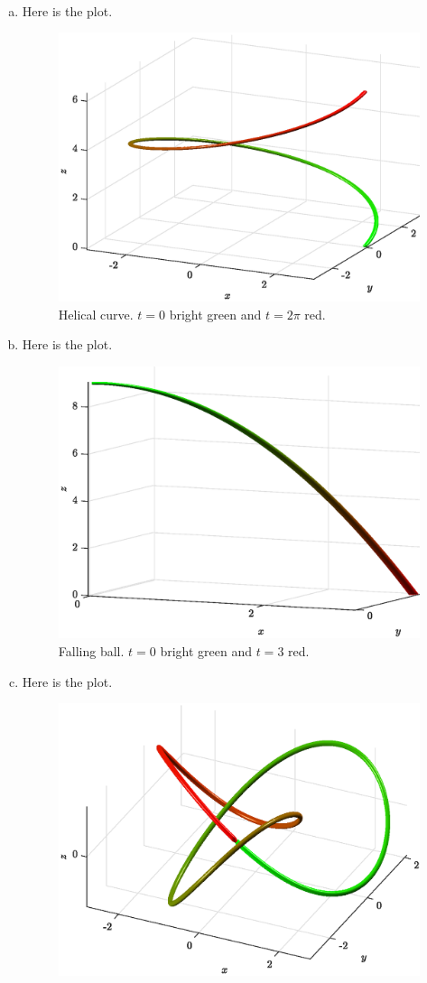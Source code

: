 \documentclass[12pt]{article} %
\begin{document}
\begin{solution}~
\begin{enumerate}[(a)]
    \item Here is the plot.
    \begin{figure}[H]
        \centering
        \includegraphics[width=.65\textwidth]{figures/helix}
        \caption{Helical curve. $t=0$ bright green and $t=2\pi$ red.}
    \end{figure}
    \item Here is the plot.
    \begin{figure}[H]
        \centering
        \includegraphics[width=.65\textwidth]{figures/falling_ball}
        \caption{Falling ball. $t=0$ bright green and $t=3$ red.}
    \end{figure}
    \item Here is the plot.
    \begin{figure}[H]
        \centering
        \includegraphics[width=.65\textwidth]{figures/trefoil_knot}

\end{figure}
\end{enumerate}
\end{solution}
\end{document}
